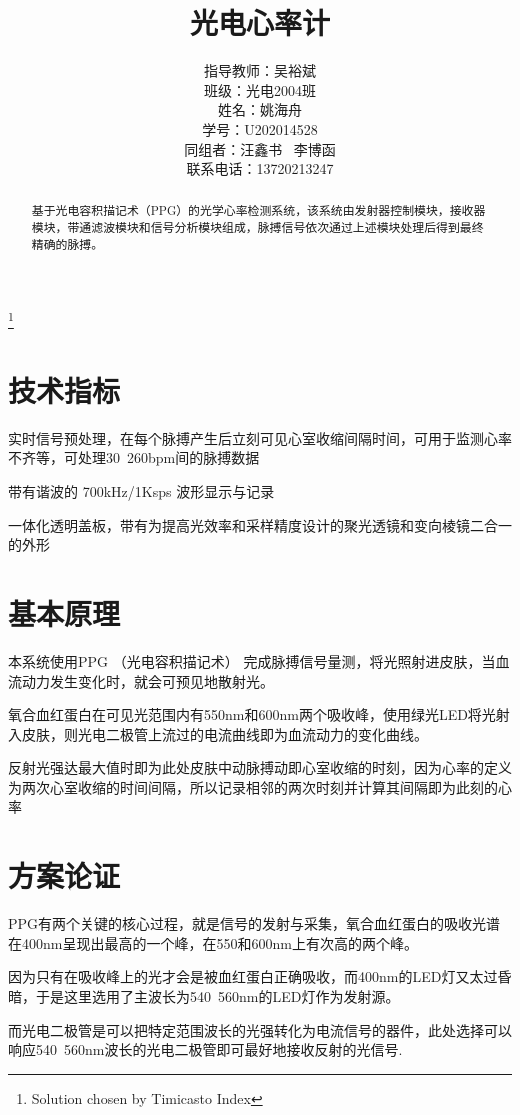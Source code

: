\documentclass[a4paper]{ctexart}
\title{光电心率计}
\author{指导教师：吴裕斌 \\ 班级：光电2004班\\姓名：姚海舟\\学号：U202014528\\同组者：汪鑫书 \ 李博函\\联系电话：13720213247}
\begin{document}
\maketitle
\thanks{Solution chosen by Timicasto Index}
\newpage
\tableofcontents

\newpage
\begin{abstract}
	基于光电容积描记术（PPG）的光学心率检测系统，该系统由发射器控制模块，接收器模块，带通滤波模块和信号分析模块组成，脉搏信号依次通过上述模块处理后得到最终精确的脉搏。
\end{abstract}


\newpage
\section{技术指标}

	实时信号预处理，在每个脉搏产生后立刻可见心室收缩间隔时间，可用于监测心率不齐等，可处理30~260bpm间的脉搏数据
	
	带有谐波的 700kHz/1Ksps 波形显示与记录
	
	一体化透明盖板，带有为提高光效率和采样精度设计的聚光透镜和变向棱镜二合一的外形

\newpage
\section{基本原理}

	本系统使用PPG （光电容积描记术） 完成脉搏信号量测，将光照射进皮肤，当血流动力发生变化时，就会可预见地散射光。
	
	氧合血红蛋白在可见光范围内有550nm和600nm两个吸收峰，使用绿光LED将光射入皮肤，则光电二极管上流过的电流曲线即为血流动力的变化曲线。
	
	反射光强达最大值时即为此处皮肤中动脉搏动即心室收缩的时刻，因为心率的定义为两次心室收缩的时间间隔，所以记录相邻的两次时刻并计算其间隔即为此刻的心率

\newpage
\section{方案论证}
	
	PPG有两个关键的核心过程，就是信号的发射与采集，氧合血红蛋白的吸收光谱在400nm呈现出最高的一个峰，在550和600nm上有次高的两个峰。
	
	因为只有在吸收峰上的光才会是被血红蛋白正确吸收，而400nm的LED灯又太过昏暗，于是这里选用了主波长为540~560nm的LED灯作为发射源。
	
	而光电二极管是可以把特定范围波长的光强转化为电流信号的器件，此处选择可以响应540~560nm波长的光电二极管即可最好地接收反射的光信号.
	
\end{document}
